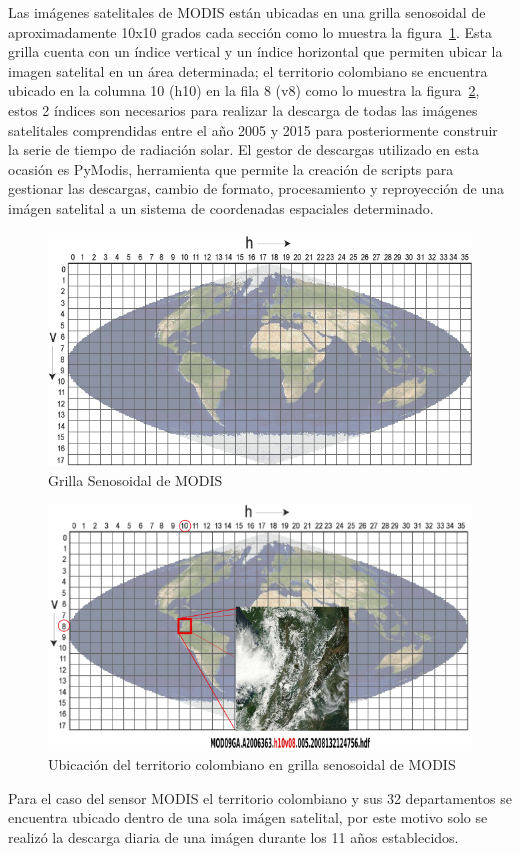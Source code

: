 Las imágenes satelitales de MODIS están ubicadas en una grilla senosoidal de aproximadamente 10x10 grados cada sección como lo muestra la 
figura~\ref{fig:gridmodis}. Esta grilla cuenta con un índice vertical y un índice horizontal que permiten ubicar la imagen satelital en un 
área determinada; el territorio colombiano se encuentra ubicado en la columna 10 (h10) en la fila 8 (v8) como lo muestra la 
figura~\ref{fig:colombiagridmodis}, estos 2 índices son necesarios para realizar la descarga de todas las imágenes satelitales comprendidas 
entre el año 2005 y 2015 para posteriormente construir la serie de tiempo de radiación solar. El gestor de descargas utilizado en esta 
ocasión es PyModis\cite{pymodisworkwithMODIS}, herramienta que permite la creación de scripts para gestionar las descargas, cambio de formato, 
procesamiento y reproyección de una imágen satelital a un sistema de coordenadas espaciales determinado.
\begin{figure}[htb]
  \centering 
  \includegraphics[scale=0.5]{pictures/MODIS_sinusoidal_grid.png}
  \caption{ Grilla Senosoidal de MODIS} 
  \label{fig:gridmodis}
\end{figure}

\begin{figure}[htb]
  \centering 
  \includegraphics[scale=0.5]{pictures/mipc.png}
  \caption{ Ubicación del territorio colombiano en grilla senosoidal de MODIS} 
  \label{fig:colombiagridmodis}
\end{figure}
Para el caso del sensor MODIS el territorio colombiano y sus 32 departamentos se encuentra ubicado dentro de una sola imágen satelital, por este motivo 
solo se realizó la descarga diaria de una imágen durante los 11 años establecidos.

